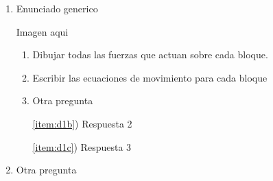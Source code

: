 \documentclass[12pt]{article}
\begin{document}
\begin{enumerate} 

\item Enunciado generico

  \begin{minipage}{0.4\linewidth}
    Imagen aqui
  \end{minipage}
  \begin{minipage}{0.6\linewidth}
    \begin{enumerate}
    \item Dibujar todas las fuerzas que actuan sobre cada bloque.
      \label{item:d1a}
    \item Escribir las ecuaciones de movimiento para cada bloque
      \label{item:d1b}
    \item Otra pregunta
      \label{item:d1c}
    \end{enumerate}
  \end{minipage}

  \begin{itemize}
  \item[\ref{item:d1b})] Respuesta 2
  \item[\ref{item:d1c})] Respuesta 3
  \end{itemize}

\newpage

\item Otra pregunta
 


\end{enumerate}
\end{document}

